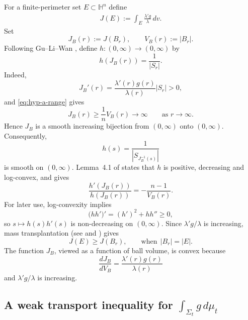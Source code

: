 \documentclass[11pt,reqno]{amsart}
\numberwithin{equation}{section}
\theoremstyle{definition}
\newcommand{\dd}{\,d}
\newcommand{\HH}{\mathbb H}
\begin{document}
For a finite-perimeter set $E\subset\HH^n$ define
\begin{align*}
    J(E):=\int_E\frac{\lambda'g}{\lambda}\,dv.
\end{align*}
 Set
\begin{equation*}
    J_B(r):=J(B_r),
    \qquad
    V_B(r):=|B_r|.
\end{equation*}
Following Gu--Li--Wan \cite[\S 4.1]{GuLiWan2025}, define $h:(0,\infty)\to(0,\infty)$ by
\begin{equation*}
    h(J_B(r))=\frac1{|S_r|}.
\end{equation*}
Indeed,
\begin{equation*}
    J_B'(r)
    =\frac{\lambda'(r)g(r)}{\lambda(r)}|S_r|>0,
\end{equation*}
and \eqref{eq:hyp-a-range} gives
\begin{equation*}
    J_B(r)\geq\frac1nV_B(r)\longrightarrow\infty
    \qquad\text{as }r\to\infty.
\end{equation*}
Hence $J_B$ is a smooth increasing bijection from $(0,\infty)$ onto
$(0,\infty)$. Consequently,
\begin{equation*}
    h(s)=\frac{1}{\left|S_{J_B^{-1}(s)}\right|}
\end{equation*}
is smooth on $(0,\infty)$. Lemma~4.1 of \cite{GuLiWan2025} states that $h$ is positive, decreasing and log-convex, and gives
\begin{equation}\label{eq:hyp-h-log-derivative}
    \frac{h'(J_B(r))}{h(J_B(r))}
    =-\frac{n-1}{V_B(r)}.
\end{equation}
For later use, log-convexity implies
\begin{equation}\label{eq:hyp-hhprime-monotone}
    \bigl(hh'\bigr)'=(h')^2+hh''\geq0,
\end{equation}
so $s\mapsto h(s)h'(s)$ is non-decreasing on $(0,\infty)$. Since $\lambda'g/\lambda$ is increasing, mass transplantation (see \cite[\S 4]{FL21} and \cite{We56}) gives
\begin{equation}\label{eq:hyp-J-mass-transplant}
    J(E)\geq J(B_r),
    \qquad \text{when}~~ |B_r|=|E|.
\end{equation}
The function $J_B$, viewed as a function of ball volume, is convex because
\begin{equation*}
    \frac{dJ_B}{dV_B}=\frac{\lambda'(r)g(r)}{\lambda(r)}
\end{equation*}
and $\lambda'g/\lambda$ is increasing.

\subsection{A weak transport inequality for \texorpdfstring{$\int_{\Sigma_t}g\dd\mu_t$}{int Sigma g}}
\end{document}
